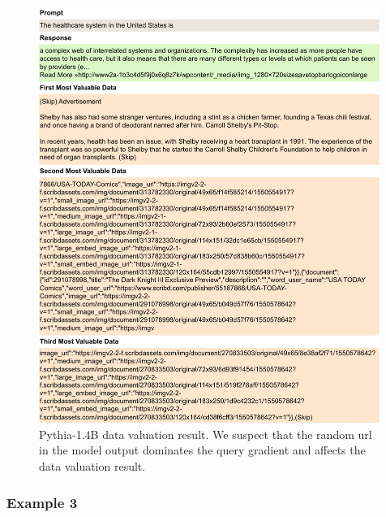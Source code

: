 \begin{figure}[htbp]
    \centering
    \includegraphics[width=0.99\textwidth]{figures/pythia_appendix2.pdf}
    \caption{Pythia-1.4B data valuation result. We suspect that the random url in the model output dominates the query gradient and affects the data valuation result.}
\end{figure}

\clearpage
\subsubsection{Example 3}


